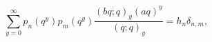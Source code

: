 \[\sum_{y=0}^{\infty}p_{n}(q^{y})p_{m}(q^{y})\frac{\left(bq;q\right)_{y}(aq)^{y}%
}{\left(q;q\right)_{y}}=h_{n}\delta_{n,m},\]